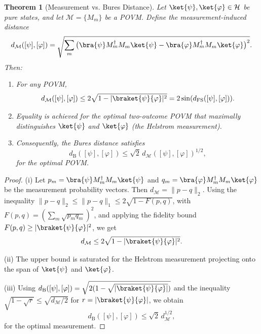 \documentclass[aps,pra,reprint,nofootinbib,showpacs,superscriptaddress]{revtex4-1}
\newtheorem{theorem}{Theorem}[section]
\newcommand{\Hilbert}{\mathcal{H}}
\begin{document}

\begin{theorem}[Measurement vs. Bures Distance]
\label{thm:universal-corrected}
Let $\ket{\psi}, \ket{\varphi} \in \Hilbert$ be pure states, and let $\mathcal{M} = \{M_m\}$ be a POVM. Define the measurement-induced distance
\[
d_{\mathcal{M}}([\psi],[\varphi]) = \sqrt{\sum_m \big(\bra{\psi} M_m^\dagger M_m \ket{\psi} - \bra{\varphi} M_m^\dagger M_m \ket{\varphi}\big)^2 }.
\]
Then:
\begin{enumerate}[label=(\roman*)]
    \item For any POVM,
    \[
    d_{\mathcal{M}}([\psi],[\varphi]) \le 2 \sqrt{1 - |\braket{\psi}{\varphi}|^2} = 2 \sin(d_{\text{FS}}([\psi],[\varphi])).
    \]
    \item Equality is achieved for the optimal two-outcome POVM that maximally distinguishes $\ket{\psi}$ and $\ket{\varphi}$ (the Helstrom measurement).
    \item Consequently, the Bures distance satisfies
  \[
d_{\text{B}}([\psi],[\varphi]) \le \sqrt{2} \, d_{\mathcal{M}}([\psi],[\varphi])^{1/2},  
\]
for the optimal POVM.
\end{enumerate}
\end{theorem}

\begin{proof}
(i) Let $p_m = \bra{\psi} M_m^\dagger M_m \ket{\psi}$ and $q_m = \bra{\varphi} M_m^\dagger M_m \ket{\varphi}$ be the measurement probability vectors. Then $d_{\mathcal{M}} = \|p-q\|_2$. Using the inequality $\|p-q\|_2 \le \|p-q\|_1 \le 2 \sqrt{1 - F(p,q)}$, with $F(p,q) = (\sum_m \sqrt{p_m q_m})^2$, and applying the fidelity bound $F(p,q) \ge |\braket{\psi}{\varphi}|^2$, we get
\[
d_{\mathcal{M}} \le 2 \sqrt{1 - |\braket{\psi}{\varphi}|^2}.
\]

(ii) The upper bound is saturated for the Helstrom measurement projecting onto the span of $\ket{\psi}$ and $\ket{\varphi}$.

(iii) Using $d_{\text{B}}([\psi],[\varphi]) = \sqrt{2(1 - \sqrt{|\braket{\psi}{\varphi}|})}$ and the inequality $\sqrt{1 - \sqrt{r}} \le \sqrt{d_{\mathcal{M}}/2}$ for $r = |\braket{\psi}{\varphi}|$, we obtain
\[
d_{\text{B}}([\psi],[\varphi]) \le \sqrt{2} \, d_{\mathcal{M}}^{1/2},
\]
for the optimal measurement.
\end{proof}
\end{document}
